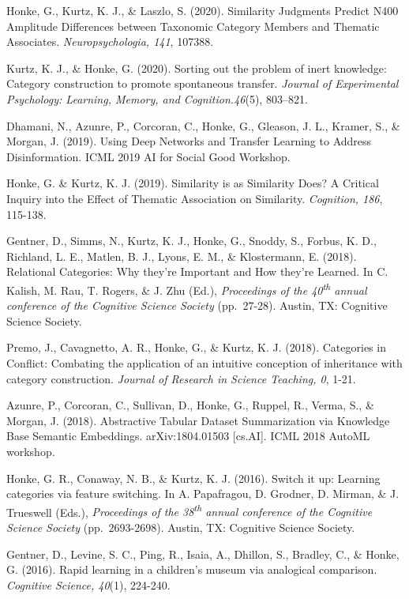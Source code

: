 \documentclass[11pt,]{article}
\begin{document}
Honke, G., Kurtz, K. J., \& Laszlo, S. (2020). Similarity Judgments
Predict N400 Amplitude Differences between Taxonomic Category Members
and Thematic Associates. \emph{Neuropsychologia, 141}, 107388.

Kurtz, K. J., \& Honke, G. (2020). Sorting out the problem of inert
knowledge: Category construction to promote spontaneous transfer.
\emph{Journal of Experimental Psychology: Learning, Memory, and
Cognition.46}(5), 803--821.

Dhamani, N., Azunre, P., Corcoran, C., Honke, G., Gleason, J. L.,
Kramer, S., \& Morgan, J. (2019). Using Deep Networks and Transfer
Learning to Address Disinformation. ICML 2019 AI for Social Good
Workshop.

Honke, G. \& Kurtz, K. J. (2019). Similarity is as Similarity Does? A
Critical Inquiry into the Effect of Thematic Association on Similarity.
\emph{Cognition, 186}, 115-138.

Gentner, D., Simms, N., Kurtz, K. J., Honke, G., Snoddy, S., Forbus, K.
D., Richland, L. E., Matlen, B. J., Lyons, E. M., \& Klostermann, E.
(2018). Relational Categories: Why they're Important and How they're
Learned. In C. Kalish, M. Rau, T. Rogers, \& J. Zhu (Ed.),
\emph{Proceedings of the 40\textsuperscript{th} annual conference of the
Cognitive Science Society} (pp.~27-28). Austin, TX: Cognitive Science
Society.

Premo, J., Cavagnetto, A. R., Honke, G., \& Kurtz, K. J. (2018).
Categories in Conflict: Combating the application of an intuitive
conception of inheritance with category construction. \emph{Journal of
Research in Science Teaching, 0}, 1-21.

Azunre, P., Corcoran, C., Sullivan, D., Honke, G., Ruppel, R., Verma,
S., \& Morgan, J. (2018). Abstractive Tabular Dataset Summarization via
Knowledge Base Semantic Embeddings. arXiv:1804.01503 {[}cs.AI{]}. ICML
2018 AutoML workshop.

Honke, G. R., Conaway, N. B., \& Kurtz, K. J. (2016). Switch it up:
Learning categories via feature switching. In A. Papafragou, D. Grodner,
D. Mirman, \& J. Trueswell (Eds.), \emph{Proceedings of the
38\textsuperscript{th} annual conference of the Cognitive Science
Society} (pp.~2693-2698). Austin, TX: Cognitive Science Society.

Gentner, D., Levine, S. C., Ping, R., Isaia, A., Dhillon, S., Bradley,
C., \& Honke, G. (2016). Rapid learning in a children's museum via
analogical comparison. \emph{Cognitive Science, 40}(1), 224-240.
\end{document}
